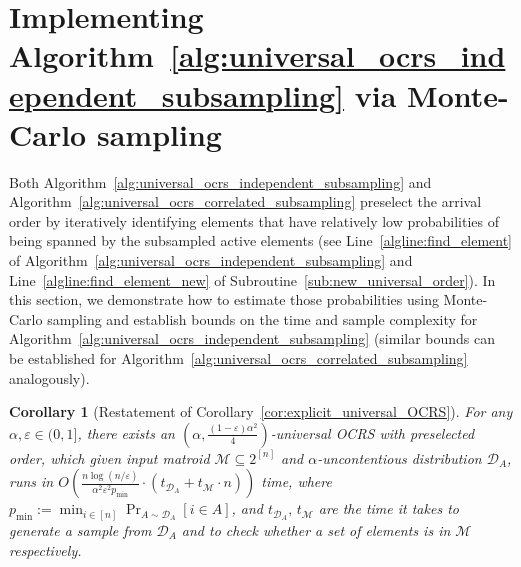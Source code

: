\documentclass[11pt]{article}
\newcommand{\D}{\mathcal D}
\newcommand{\M}{{\mathcal M}}
\newcommand{\eps}{\varepsilon}
\newtheorem{corollary}[theorem]{Corollary}
\begin{document}
\section{Implementing Algorithm~\ref{alg:universal_ocrs_independent_subsampling} via Monte-Carlo sampling}\label{sec:monte-carlo}
Both Algorithm~\ref{alg:universal_ocrs_independent_subsampling} and Algorithm~\ref{alg:universal_ocrs_correlated_subsampling} preselect the arrival order by iteratively identifying elements that have relatively low probabilities of being spanned by the subsampled active elements (see Line~\ref{algline:find_element} of Algorithm~\ref{alg:universal_ocrs_independent_subsampling} and Line~\ref{algline:find_element_new} of Subroutine~\ref{sub:new_universal_order}). In this section, we demonstrate how to estimate those probabilities using Monte-Carlo sampling and establish bounds on the time and sample complexity for Algorithm~\ref{alg:universal_ocrs_independent_subsampling} (similar bounds can be established for Algorithm~\ref{alg:universal_ocrs_correlated_subsampling} analogously).
\begin{corollary}[Restatement of Corollary~\ref{cor:explicit_universal_OCRS}]
For any $\alpha,\eps\in(0,1]$, there exists an $(\alpha,\frac{(1-\eps)\alpha^2}{4})$-universal OCRS with preselected order, which given input matroid $\M\subseteq2^{[n]}$ and $\alpha$-uncontentious distribution $\D_A$, runs in $O\left(\frac{n\log(n/\eps)}{\alpha^2\eps^2 p_{\min}}\cdot (t_{\D_A}+t_{\M}\cdot n)\right)$ time, where $p_{\min}:=\min_{i\in[n]}\Pr_{A\sim\D_A}[i\in A]$, and $t_{\D_A},\,t_{\M}$ are the time it takes to generate a sample from $\D_A$ and to check whether a set of elements is in $\M$ respectively.
\end{corollary}
\end{document}

